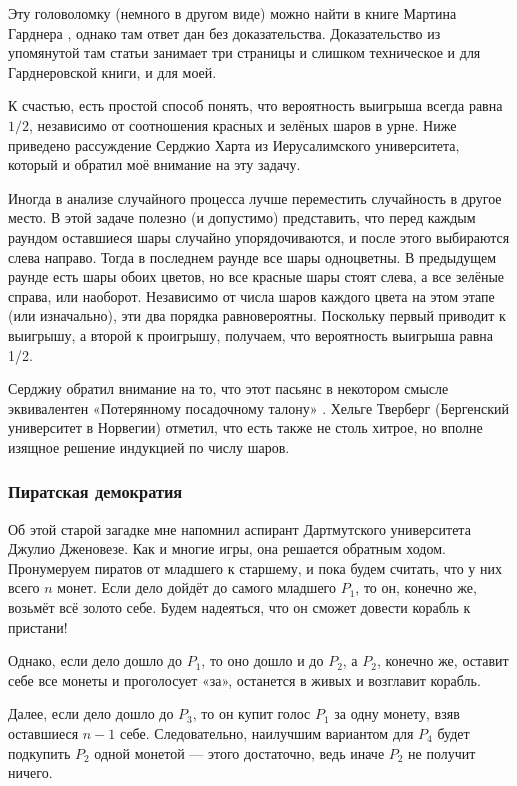 Эту головоломку (немного в другом виде) можно найти в книге Мартина Гарднера \cite[2.16]{30}, однако там ответ дан без доказательства.
Доказательство из упомянутой там статьи \cite{45} занимает три страницы и слишком техническое и для Гарднеровской книги, и для моей.

К счастью, есть простой способ понять, что вероятность выигрыша всегда равна $1/2$, независимо от соотношения красных и зелёных шаров в урне.
Ниже приведено рассуждение Серджио Харта из Иерусалимского университета, который и обратил моё внимание на эту задачу.

Иногда в анализе случайного процесса лучше переместить случайность в другое место.
В этой задаче полезно (и допустимо) представить, что перед каждым раундом оставшиеся шары случайно упорядочиваются, и после этого выбираются слева направо.
Тогда в последнем раунде все шары одноцветны.
В предыдущем раунде есть шары обоих цветов, но все красные шары стоят слева, а все зелёные справа, или наоборот.
Независимо от числа шаров каждого цвета на этом этапе (или изначально), эти два порядка равновероятны.
Поскольку первый приводит к выигрышу, а второй к проигрышу, получаем, что вероятность выигрыша равна 1/2.

Серджиу обратил внимание на то, что этот пасьянс в некотором смысле эквивалентен «Потерянному посадочному талону» \cite[стр. 42]{59}.
Хельге Тверберг (Бергенский университет в Норвегии) отметил, что есть также не столь хитрое, но вполне изящное решение индукцией по числу шаров.

\subsubsection*{Пиратская демократия}

Об этой старой загадке мне напомнил аспирант Дартмутского университета Джулио Дженовезе.
Как и многие игры, она решается обратным ходом.
Пронумеруем пиратов от младшего к старшему, и пока будем считать, что у них всего $n$ монет.
Если дело дойдёт до самого младшего $P_1$, то он, конечно же, возьмёт всё золото себе. Будем надеяться, что он сможет довести корабль к пристани!

Однако, если дело дошло до $P_1$, то оно дошло и до $P_2$, а
$P_2$, конечно же, оставит себе все монеты и проголосует «за», останется в живых и возглавит корабль.

Далее, если дело дошло до $P_3$, то он купит голос $P_1$ за одну монету, взяв оставшиеся $n - 1$ себе.
Следовательно, наилучшим вариантом для $P_4$ будет подкупить $P_2$ одной монетой --- этого достаточно, ведь иначе $P_2$ не получит ничего.

